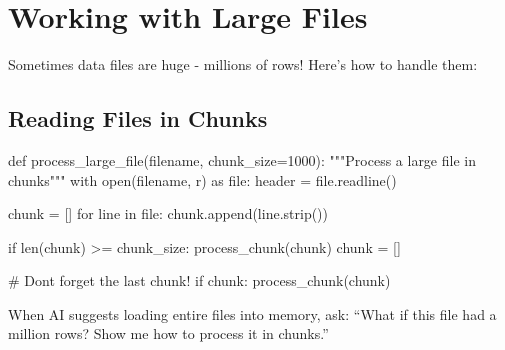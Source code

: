 \documentclass[
  letterpaper,
  DIV=11,
  numbers=noendperiod,
  oneside]{scrreprt}
\newenvironment{Shaded}{}{}
\newcommand{\BuiltInTok}[1]{\textcolor[rgb]{0.84,0.23,0.29}{#1}}
\newcommand{\CommentTok}[1]{\textcolor[rgb]{0.42,0.45,0.49}{#1}}
\newcommand{\ControlFlowTok}[1]{\textcolor[rgb]{0.84,0.23,0.29}{#1}}
\newcommand{\DecValTok}[1]{\textcolor[rgb]{0.00,0.36,0.77}{#1}}
\newcommand{\ImportTok}[1]{\textcolor[rgb]{0.01,0.18,0.38}{#1}}
\newcommand{\KeywordTok}[1]{\textcolor[rgb]{0.84,0.23,0.29}{#1}}
\newcommand{\NormalTok}[1]{\textcolor[rgb]{0.14,0.16,0.18}{#1}}
\newcommand{\OperatorTok}[1]{\textcolor[rgb]{0.14,0.16,0.18}{#1}}
\newcommand{\StringTok}[1]{\textcolor[rgb]{0.01,0.18,0.38}{#1}}
\begin{document}
\section{Working with Large Files}\label{working-with-large-files}

Sometimes data files are huge - millions of rows! Here's how to handle
them:

\subsection{Reading Files in Chunks}\label{reading-files-in-chunks}

\begin{Shaded}
\begin{Highlighting}[]
\KeywordTok{def}\NormalTok{ process\_large\_file(filename, chunk\_size}\OperatorTok{=}\DecValTok{1000}\NormalTok{):}
    \CommentTok{"""Process a large file in chunks"""}
    \ControlFlowTok{with} \BuiltInTok{open}\NormalTok{(filename, }\StringTok{\textquotesingle{}r\textquotesingle{}}\NormalTok{) }\ImportTok{as} \BuiltInTok{file}\NormalTok{:}
\NormalTok{        header }\OperatorTok{=} \BuiltInTok{file}\NormalTok{.readline()}
        
\NormalTok{        chunk }\OperatorTok{=}\NormalTok{ []}
        \ControlFlowTok{for}\NormalTok{ line }\KeywordTok{in} \BuiltInTok{file}\NormalTok{:}
\NormalTok{            chunk.append(line.strip())}
            
            \ControlFlowTok{if} \BuiltInTok{len}\NormalTok{(chunk) }\OperatorTok{\textgreater{}=}\NormalTok{ chunk\_size:}
\NormalTok{                process\_chunk(chunk)}
\NormalTok{                chunk }\OperatorTok{=}\NormalTok{ []}
        
        \CommentTok{\# Don\textquotesingle{}t forget the last chunk!}
        \ControlFlowTok{if}\NormalTok{ chunk:}
\NormalTok{            process\_chunk(chunk)}
\end{Highlighting}
\end{Shaded}

\begin{tcolorbox}[enhanced jigsaw, opacityback=0, colback=white, colframe=quarto-callout-tip-color-frame, breakable, titlerule=0mm, coltitle=black, rightrule=.15mm, colbacktitle=quarto-callout-tip-color!10!white, left=2mm, bottomtitle=1mm, bottomrule=.15mm, title=\textcolor{quarto-callout-tip-color}{\faLightbulb}\hspace{0.5em}{Memory Management}, opacitybacktitle=0.6, toptitle=1mm, leftrule=.75mm, arc=.35mm, toprule=.15mm]

When AI suggests loading entire files into memory, ask: ``What if this
file had a million rows? Show me how to process it in chunks.''

\end{tcolorbox}
\end{document}
